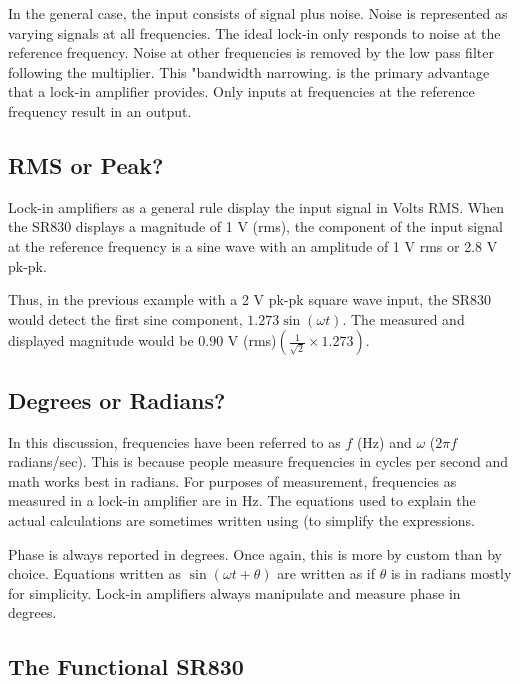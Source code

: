 \documentclass{../lab}
\begin{document}
In the general case, the input consists of signal plus noise. Noise is represented as varying signals at all frequencies. The ideal lock-in only responds to noise at the reference frequency. Noise at other frequencies is removed by the low pass filter following the multiplier. This "bandwidth narrowing. is the primary advantage that a lock-in amplifier provides. Only inputs at frequencies at the reference frequency result in an output.

\subsection{RMS or Peak?}

Lock-in amplifiers as a general rule display the input signal in Volts RMS. When the SR830 displays a magnitude of 1 V (rms), the component of the input signal at the reference frequency is a sine wave with an amplitude of 1 V rms or 2.8 V pk-pk.

Thus, in the previous example with a 2 V pk-pk square wave input, the SR830 would detect the first sine component, $1.273 \sin(\omega t)$. The measured and displayed magnitude would be 0.90 V (rms)$\left(\frac{1}{\sqrt{2}} \times 1.273 \right)$.

\subsection{Degrees or Radians?}

In this discussion, frequencies have been referred to as $f$ (Hz) and $\omega$ ($2 \pi f$ radians/sec). This is because people measure frequencies in cycles per second and math works best in radians. For purposes of measurement, frequencies as measured in a lock-in amplifier are in Hz. The equations used to explain the actual calculations are sometimes written using (to simplify the expressions.

Phase is always reported in degrees. Once again, this is more by custom than by choice. Equations written as $\sin(\omega t + \theta)$ are written as if $\theta$ is in radians mostly for simplicity. Lock-in amplifiers always manipulate and measure phase in degrees.

\subsection{The Functional SR830}
\end{document}

